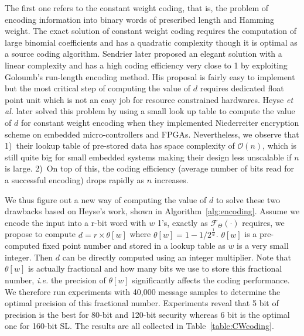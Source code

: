 \documentclass[10pt,journal,compsoc]{IEEEtran}
\begin{document}
The first one refers to the constant weight coding, that is, the problem of encoding information into binary words of prescribed length and Hamming weight. The exact solution \cite{cover1973enumerative} of constant weight coding requires the computation of large binomial coefficients and has a quadratic complexity though it is optimal as a source coding algorithm. Sendrier later proposed an elegant solution \cite{sendrier2005encoding} with a linear complexity and has a high coding efficiency very close to 1 by exploiting Goloumb's run-length encoding method\cite{goloumb1966run}. His proposal is fairly easy to implement but the most critical step of computing the value of $d$ requires dedicated float point unit which is not an easy job for resource constrained hardwares. Heyse \textit{et al.} later solved this problem by using a small look up table to compute the value of $d$ for constant weight encoding\cite{heyse2010low,heyse2012towards} when they implemented Niederreiter encryption scheme \cite{niederreiter1986knapsack} on embedded micro-controllers and FPGAs. Nevertheless, we observe that 1)~their lookup table of pre-stored data has space complexity of  $\mathcal{O}(n)$, which is still quite big for small embedded systems making their design less unscalable if $n$ is large. 2)~On top of this, the coding efficiency (average number of bits read for a successful encoding) drops rapidly as $n$ increases.

We thus figure out a new way of computing the value of $d$ to solve these two drawbacks based on Heyse's work, shown in Algorithm~\ref{alg:encoding}. Assume we encode the input into a r-bit word with $w$ 1's, exactly as $\mathcal{F}_\Theta(\cdot)$ requires,  we propose to compute $d=r\times \theta[w]$ where
$\theta[w]=1-1/2^{\frac{1}{w}}$.  $\theta[w]$ is a pre-computed fixed point number and stored in a lookup table as $w$ is a very small integer. Then $d$ can be directly
computed using an integer multiplier. Note that $\theta[w]$ is actually fractional and how many bits we use to store this fractional number, \textit{i.e.} the precision of $\theta[w]$ significantly  affects the coding performance.  We therefore run experiments with 40,000 message samples to determine the optimal precision of this fractional number. Experiments reveal that 5 bit of precision is the best for 80-bit and 120-bit security whereas 6 bit is the optimal one for 160-bit SL. The results are all collected in Table~\ref{table:CWcoding}.
\end{document}

